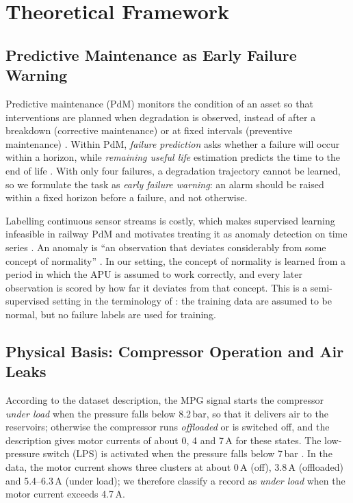 \section{Theoretical Framework}
\label{sec:theory}

\subsection{Predictive Maintenance as Early Failure Warning}
Predictive maintenance (PdM) monitors the condition of an asset so that interventions are planned when degradation is observed, instead of after a breakdown (corrective maintenance) or at fixed intervals (preventive maintenance) \citep{davari2021survey}. Within PdM, \emph{failure prediction} asks whether a failure will occur within a horizon, while \emph{remaining useful life} estimation predicts the time to the end of life \citep{davari2021survey}. With only four failures, a degradation trajectory cannot be learned, so we formulate the task as \emph{early failure warning}: an alarm should be raised within a fixed horizon before a failure, and not otherwise.

Labelling continuous sensor streams is costly, which makes supervised learning infeasible in railway PdM and motivates treating it as anomaly detection on time series \citep{davari2021survey}. An anomaly is ``an observation that deviates considerably from some concept of normality'' \citep{ruff2021unifying}. In our setting, the concept of normality is learned from a period in which the APU is assumed to work correctly, and every later observation is scored by how far it deviates from that concept. This is a semi-supervised setting in the terminology of \citet{ruff2021unifying}: the training data are assumed to be normal, but no failure labels are used for training.

\subsection{Physical Basis: Compressor Operation and Air Leaks}
\label{sec:physics}
According to the dataset description, the MPG signal starts the compressor \emph{under load} when the pressure falls below 8.2\,bar, so that it delivers air to the reservoirs; otherwise the compressor runs \emph{offloaded} or is switched off, and the description gives motor currents of about 0, 4 and 7\,A for these states. The low-pressure switch (LPS) is activated when the pressure falls below 7\,bar \citep{davari2021metropt3data}. In the data, the motor current shows three clusters at about 0\,A (off), 3.8\,A (offloaded) and 5.4--6.3\,A (under load); we therefore classify a record as \emph{under load} when the motor current exceeds 4.7\,A.

